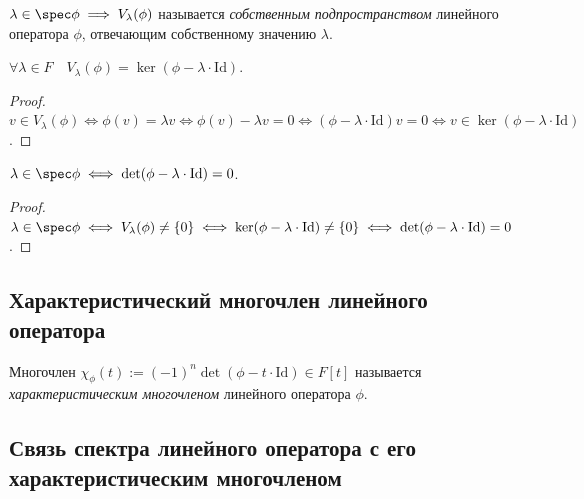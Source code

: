 \begin{definition}
    $\lambda \in \spec \phi \implies V_\lambda(\phi)$ называется \textit{собственным подпространством} линейного оператора $\phi$, отвечающим собственному значению $\lambda$.
\end{definition}

\begin{proposal}
    $\forall \lambda \in F \quad V_\lambda(\phi) = \ker(\phi - \lambda \cdot \mathrm{Id})$.
\end{proposal}

\begin{proof}
    $v \in V_\lambda(\phi) \iff \phi(v) = \lambda v \iff \phi(v) - \lambda v = 0 \iff (\phi - \lambda \cdot \mathrm{Id}) v = 0 \iff v \in \ker(\phi - \lambda \cdot \mathrm{Id})$.
\end{proof}

\begin{corollary}
    $\lambda \in \spec \phi \iff \det (\phi - \lambda \cdot \mathrm{Id}) = 0$.
\end{corollary}

\begin{proof}
    $\lambda \in \spec \phi \iff V_\lambda(\phi) \neq \{0\} \iff \ker(\phi - \lambda \cdot \mathrm{Id}) \neq \{0\} \iff \det(\phi - \lambda \cdot \mathrm{Id}) = 0$.
\end{proof}

\subsection{Характеристический многочлен линейного оператора}

\begin{definition}
    Многочлен $\chi_\phi(t) := (-1)^n \det(\phi - t \cdot \mathrm{Id}) \in F[t]$ называется \textit{характеристическим многочленом} линейного оператора $\phi$.
\end{definition}


\subsection{Связь спектра линейного оператора с его характеристическим многочленом}

